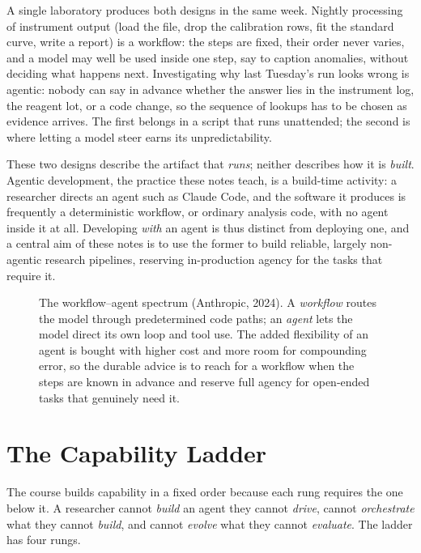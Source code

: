 \begin{example}
A single laboratory produces both designs in the same week.
Nightly processing of instrument output (load the file, drop the calibration rows, fit the standard curve, write a report) is a workflow: the steps are fixed, their order never varies, and a model may well be used inside one step, say to caption anomalies, without deciding what happens next.
Investigating why last Tuesday's run looks wrong is agentic: nobody can say in advance whether the answer lies in the instrument log, the reagent lot, or a code change, so the sequence of lookups has to be chosen as evidence arrives.
The first belongs in a script that runs unattended; the second is where letting a model steer earns its unpredictability.
\end{example}

These two designs describe the artifact that \emph{runs}; neither describes how it is \emph{built}.
Agentic development, the practice these notes teach, is a build-time activity: a researcher directs an agent such as Claude Code, and the software it produces is frequently a deterministic workflow, or ordinary analysis code, with no agent inside it at all.
Developing \emph{with} an agent is thus distinct from deploying one, and a central aim of these notes is to use the former to build reliable, largely non-agentic research pipelines, reserving in-production agency for the tasks that require it.

\begin{figure}[htb!]
\begin{center}

\caption{The workflow--agent spectrum (Anthropic, 2024).
A \emph{workflow} routes the model through predetermined code paths; an \emph{agent} lets the model direct its own loop and tool use.
The added flexibility of an agent is bought with higher cost and more room for compounding error, so the durable advice is to reach for a workflow when the steps are known in advance and reserve full agency for open-ended tasks that genuinely need it.}
\label{figure:WorkflowAgentSpectrum}
\end{center}
\end{figure}

\section{The Capability Ladder}
\label{section:CapabilityLadder}

The course builds capability in a fixed order because each rung requires the one below it.
A researcher cannot \emph{build} an agent they cannot \emph{drive}, cannot \emph{orchestrate} what they cannot \emph{build}, and cannot \emph{evolve} what they cannot \emph{evaluate}.
The ladder has four rungs.

